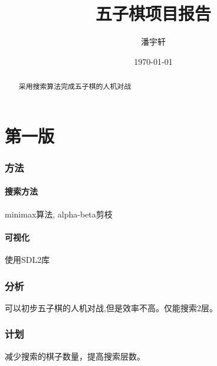 \documentclass[a4paper,12pt]{article}
\title{五子棋项目报告}
\author{潘宇轩}
\date{\today}
\begin{document}
\maketitle

\begin{abstract}
    采用搜索算法完成五子棋的人机对战
\end{abstract}

\tableofcontents
\part{第一版}

\section{方法}

\subsection{搜索方法}
minimax算法, alpha-beta剪枝

\subsection{可视化}
使用SDL2库

\section{分析}
可以初步五子棋的人机对战,但是效率不高。仅能搜索2层。

\section{计划}
减少搜索的棋子数量，提高搜索层数。
\end{document}
